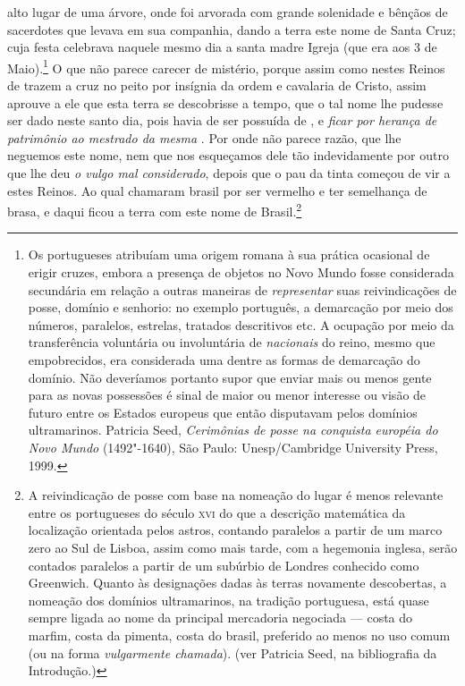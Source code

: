 alto lugar de uma árvore, onde foi arvorada com grande solenidade e
bênçãos de sacerdotes que levava em sua companhia, dando a terra este
nome de Santa Cruz; cuja festa celebrava naquele mesmo dia a santa			%
madre Igreja (que era aos 3 de Maio).\footnote{ Os portugueses
atribuíam uma origem romana à sua prática ocasional de erigir cruzes,
embora a presença de objetos no Novo Mundo fosse considerada secundária
em relação a outras maneiras de \textit{representar} suas
reivindicações de posse, domínio e senhorio: no exemplo português, a
demarcação por meio dos números, paralelos, estrelas, tratados
descritivos etc. A ocupação por meio da transferência voluntária ou
involuntária de \textit{nacionais} do reino, mesmo que empobrecidos,
era considerada uma dentre as formas de demarcação do domínio. Não
deveríamos portanto supor que enviar mais ou menos gente para as novas
possessões é sinal de maior ou menor interesse ou visão de futuro entre
os Estados europeus que então disputavam pelos domínios ultramarinos.
Patricia Seed, \textit{Cerimônias de posse na conquista européia do Novo
Mundo} (1492"-1640), São Paulo: Unesp/Cambridge University Press, 1999.} 
O que não parece carecer de
mistério, porque assim como nestes Reinos de  trazem a cruz no
peito por insígnia da ordem e cavalaria de Cristo, assim aprouve a ele
que esta terra se descobrisse a tempo, que o tal nome lhe pudesse ser
dado neste santo dia, pois havia de ser possuída de , e
\textit{ficar por herança de patrimônio ao mestrado da mesma }. Por onde não parece razão, que lhe neguemos este nome, nem
que nos esqueçamos dele tão indevidamente por outro que lhe deu
\textit{o vulgo mal considerado}, depois que o pau da tinta começou de			%
vir a estes Reinos. Ao qual chamaram brasil por ser vermelho e ter
semelhança de brasa, e daqui ficou a terra com este nome de
Brasil.\footnote{ A reivindicação de posse com
base na nomeação do lugar é menos relevante entre os portugueses do
século \textsc{xvi} do que a descrição matemática da localização orientada pelos
astros, contando paralelos a partir de um marco zero ao Sul de Lisboa,
assim como mais tarde, com a hegemonia inglesa, serão contados paralelos
a partir de um subúrbio de Londres conhecido como Greenwich. Quanto às
designações dadas às terras novamente descobertas, a nomeação dos
domínios ultramarinos, na tradição portuguesa, está quase sempre ligada
ao nome da principal mercadoria negociada --- costa do marfim, costa da
pimenta, costa do brasil, preferido ao menos no uso comum (ou na
forma \textit{vulgarmente chamada}). (ver Patricia Seed, na bibliografia da Introdução.)} 
